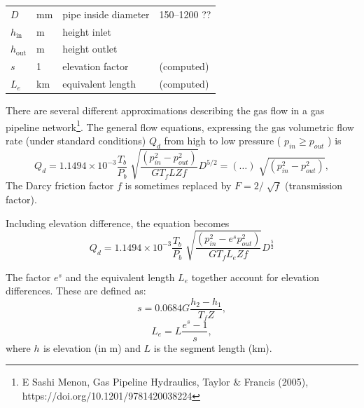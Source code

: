 \documentclass[12pt]{article}
\begin{document}
\begin{table}[]
\begin{tabular}{llp{12em}p{8em}}
$D$            & mm     & pipe inside diameter                                  & 150–1200 ??                \\
$h_\text{in}$  & m      & height inlet                                          &                            \\
$h_\text{out}$ & m      & height outlet                                         &                            \\
$s$            & 1      & elevation factor                                      & (computed)                 \\
$L_e$          & km     & equivalent length                                     & (computed)    \\
\hline            
\end{tabular}
\end{table}




There are several different approximations describing the gas flow in a gas pipeline network\footnote{ E Sashi Menon, Gas Pipeline Hydraulics, Taylor $\&$  Francis (2005), https://doi.org/10.1201/9781420038224  }. The general flow equations, expressing the gas volumetric flow rate (under standard conditions)  \( Q_{d} \)  from high to low pressure ( \( p_{in} \geq p_{out} \) ) is
\begin{equation}
  Q_{d}=1.1494 \times 10^{-3}\frac{T_{b}}{P_{b}}\sqrt[]{\frac{ \left( p_{in}^{2}-p_{out}^{2} \right) }{GT_{f}LZf}}D^{5/2}= \left(  \ldots  \right) \sqrt[]{ \left( p_{in}^{2}-p_{out}^{2} \right) }, 
\end{equation}
%
The Darcy friction factor  \( f \)  is sometimes replaced by  \( F=2/\sqrt[]{f} \)  (transmission factor). 


Including elevation difference, the equation becomes
\begin{equation}
  Q_{d}=1.1494 \times 10^{-3}\frac{T_{b}}{P_{b}}\sqrt[]{\frac{ \left( p_{in}^{2}-e^{s}p_{out}^{2} \right) }{GT_{f}L_{e}Zf}}D^{\frac{5}{2}} 
\end{equation}


The factor  \( e^{s} \)  and the equivalent length  \( L_{e} \)  together account for elevation differences. These are defined as:
\begin{equation} 
	s=0.0684 G\frac{h_{2}-h_{1}}{T_{f}Z}, 
\end{equation}
\begin{equation}
	 L_{e}=L\frac{e^{s}-1}{s}, 
\end{equation} 
where  \( h_{} \)  is elevation (in m) and  \( L \)  is the segment length (km).
\end{document}
